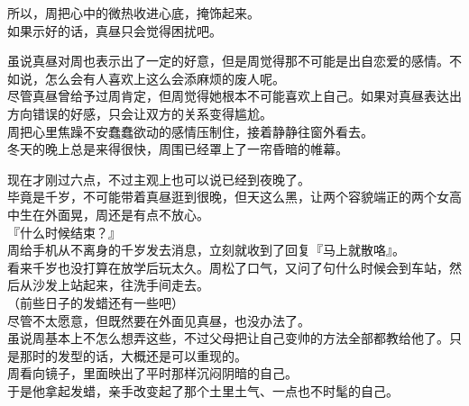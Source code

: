 所以，周把心中的微热收进心底，掩饰起来。\\

如果示好的话，真昼只会觉得困扰吧。

虽说真昼对周也表示出了一定的好意，但是周觉得那不可能是出自恋爱的感情。不如说，怎么会有人喜欢上这么会添麻烦的废人呢。\\

尽管真昼曾给予过周肯定，但周觉得她根本不可能喜欢上自己。如果对真昼表达出方向错误的好感，只会让双方的关系变得尴尬。\\

周把心里焦躁不安蠢蠢欲动的感情压制住，接着静静往窗外看去。\\

冬天的晚上总是来得很快，周围已经罩上了一帘昏暗的帷幕。

现在才刚过六点，不过主观上也可以说已经到夜晚了。\\

毕竟是千岁，不可能带着真昼逛到很晚，但天这么黑，让两个容貌端正的两个女高中生在外面晃，周还是有点不放心。\\

『什么时候结束？』\\

周给手机从不离身的千岁发去消息，立刻就收到了回复『马上就散咯』。\\

看来千岁也没打算在放学后玩太久。周松了口气，又问了句什么时候会到车站，然后从沙发上站起来，往洗手间走去。\\

（前些日子的发蜡还有一些吧）\\

尽管不太愿意，但既然要在外面见真昼，也没办法了。\\

虽说周基本上不怎么想弄这些，不过父母把让自己变帅的方法全部都教给他了。只是那时的发型的话，大概还是可以重现的。\\

周看向镜子，里面映出了平时那样沉闷阴暗的自己。\\

于是他拿起发蜡，亲手改变起了那个土里土气、一点也不时髦的自己。
